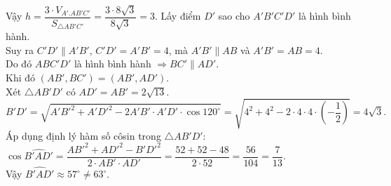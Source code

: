 \begin{ex}
{\begin{itemchoice}
			Vậy $h = \dfrac{3 \cdot V_{A'. AB'C'}}{S_{\triangle AB'C'}} = \dfrac{3 \cdot 8\sqrt{3}}{8\sqrt{3}} = 3$.
			\itemch Lấy điểm $D'$ sao cho $A'B'C'D'$ là hình bình hành.\\
			Suy ra $C'D'\parallel A'B'$, $C'D' = A'B' = 4$, mà $A'B'\parallel AB$ và $A'B' = AB=4$.\\
			Do đó $ABC'D'$ là hình bình hành $\Rightarrow BC' \parallel AD'$. \\
			Khi đó $(AB', BC') = (AB', AD')$.\\
			Xét $\triangle AB'D'$ có $AD' = AB' = 2\sqrt{13}$.
			\[B'D' = \sqrt{A'B'^2+A'D'^2-2A'B'\cdot A'D' \cdot \cos 120^\circ} = \sqrt{4^2 + 4^2 - 2 \cdot 4 \cdot 4 \cdot \left(-\dfrac{1}{2}\right)} = 4\sqrt{3}.\]
			Áp dụng định lý hàm số côsin trong $\triangle AB'D'$: \\
			$\cos \widehat{B'AD'} = \dfrac{AB'^2 + AD'^2 - B'D'^2}{2 \cdot AB' \cdot AD'} = \dfrac{52 + 52 - 48}{2 \cdot 52} = \dfrac{56}{104} = \dfrac{7}{13}$.\\
			Vậy $\widehat{B'AD'} \approx 57^\circ \neq 63^\circ$.
		\end{itemchoice}
	}
\end{ex}


